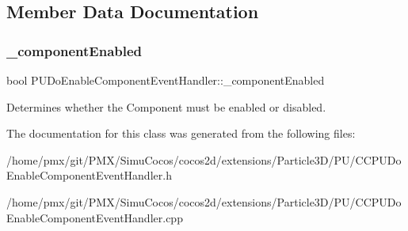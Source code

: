 \subsection{Member Data Documentation}
\mbox{\label{classPUDoEnableComponentEventHandler_a25a6b692041994ae3e3f6716f74b1095}} 
\subsubsection{\texorpdfstring{\+\_\+component\+Enabled}{\_componentEnabled}}
{\footnotesize\ttfamily bool P\+U\+Do\+Enable\+Component\+Event\+Handler\+::\+\_\+component\+Enabled\hspace{0.3cm}{\ttfamily [protected]}}

Determines whether the Component must be enabled or disabled. 

The documentation for this class was generated from the following files\+:\begin{DoxyCompactItemize}
\item 
/home/pmx/git/\+P\+M\+X/\+Simu\+Cocos/cocos2d/extensions/\+Particle3\+D/\+P\+U/C\+C\+P\+U\+Do\+Enable\+Component\+Event\+Handler.\+h\item 
/home/pmx/git/\+P\+M\+X/\+Simu\+Cocos/cocos2d/extensions/\+Particle3\+D/\+P\+U/C\+C\+P\+U\+Do\+Enable\+Component\+Event\+Handler.\+cpp\end{DoxyCompactItemize}
